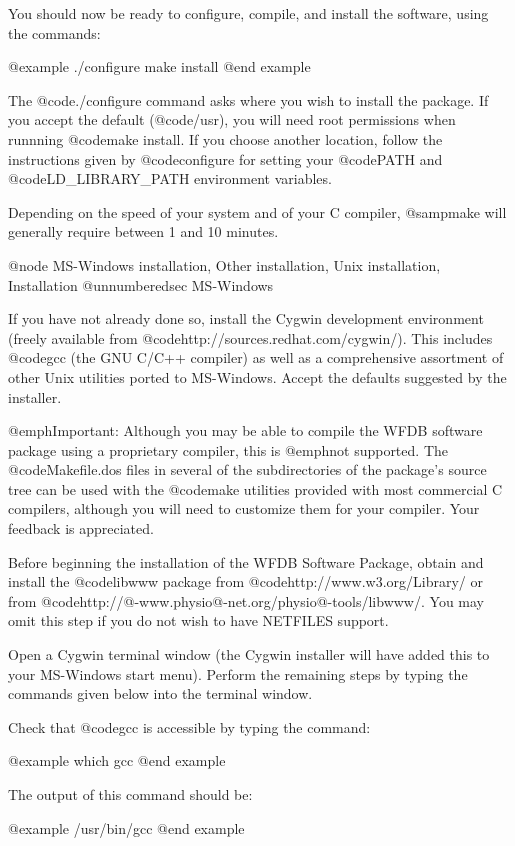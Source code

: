 {{{{{{{{{You should now be ready to configure, compile, and install the software, using
the commands:

@example
./configure
make install
@end example

The @code{./configure} command asks where you wish to install the package.
If you accept the default (@code{/usr}), you will need root permissions when
runnning @code{make install}.  If you choose another location, follow the
instructions given by @code{configure} for setting your @code{PATH} and
@code{LD\_LIBRARY\_PATH} environment variables.

Depending on the speed of your system and of your C compiler, @samp{make} will
generally require between 1 and 10 minutes.

@node MS-Windows installation, Other installation, Unix installation, Installation
@unnumberedsec MS-Windows

If you have not already done so, install the Cygwin development environment
(freely available from @code{http://sources.redhat.com/cygwin/}).  This
includes @code{gcc} (the GNU C/C++ compiler) as well as a comprehensive
assortment of other Unix utilities ported to MS-Windows.  Accept the defaults
suggested by the installer.

@emph{Important:} Although you may be able to compile the WFDB software package
using a proprietary compiler, this is @emph{not supported}.  The
@code{Makefile.dos} files in several of the subdirectories of the package's
source tree can be used with the @code{make} utilities provided with most
commercial C compilers, although you will need to customize them for your
compiler. Your feedback is appreciated.

Before beginning the installation of the WFDB Software Package, obtain and
install the @code{libwww} package from @code{http://www.w3.org/Library/} or
from @code{http://@-www.physio@-net.org/physio@-tools/libwww/}.  You may
omit this step if you do not wish to have NETFILES support.

Open a Cygwin terminal window (the Cygwin installer will have added this to
your MS-Windows start menu).  Perform the remaining steps by typing the
commands given below into the terminal window.

Check that @code{gcc} is accessible by typing the command:

@example
which gcc
@end example

The output of this command should be:

@example
/usr/bin/gcc
@end example

}}}}}}}}}
